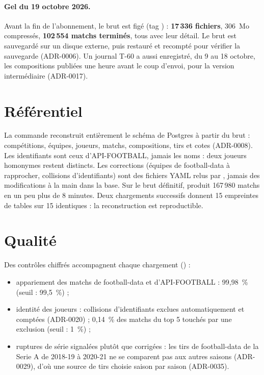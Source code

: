 \paragraph{Gel du 19 octobre 2026.} Avant la fin de l'abonnement, le brut est figé (tag
) : \textbf{17\,336 fichiers}, 306~Mo compressés, \textbf{102\,554 matchs
terminés}, tous avec leur détail. Le brut est sauvegardé sur un disque externe, puis restauré et
recompté pour vérifier la sauvegarde (ADR-0006). Un journal \og T-60 \fg{} a aussi enregistré, du 9 au
18 octobre, les compositions publiées une heure avant le coup d'envoi, pour la version
intermédiaire (ADR-0017).

\section{Référentiel}

La commande  reconstruit entièrement le schéma  de Postgres à partir du brut :
compétitions, équipes, joueurs, matchs, compositions, tirs et cotes (ADR-0008). Les identifiants sont
ceux d'API-FOOTBALL, jamais les noms : deux joueurs homonymes restent distincts. Les corrections
(équipes de football-data à rapprocher, collisions d'identifiants) sont des fichiers YAML relus par
, jamais des modifications à la main dans la base. Sur le brut définitif, 
produit 167\,980 matchs en un peu plus de 8 minutes. Deux chargements successifs donnent 15 empreintes
de tables sur 15 identiques : la reconstruction est reproductible.

\section{Qualité}

Des contrôles chiffrés accompagnent chaque chargement () :

\begin{itemize}
  \item appariement des matchs de football-data et d'API-FOOTBALL : 99,98~\% (seuil : 99,5~\%) ;
  \item identité des joueurs : collisions d'identifiants exclues automatiquement et comptées
        (ADR-0020) ; 0,14~\% des matchs du top 5 touchés par une exclusion (seuil : 1~\%) ;
  \item ruptures de série signalées plutôt que corrigées : les tirs de football-data de la Serie A
        de 2018-19 à 2020-21 ne se comparent pas aux autres saisons (ADR-0029), d'où une source de tirs
        choisie saison par saison (ADR-0035).
\end{itemize}

